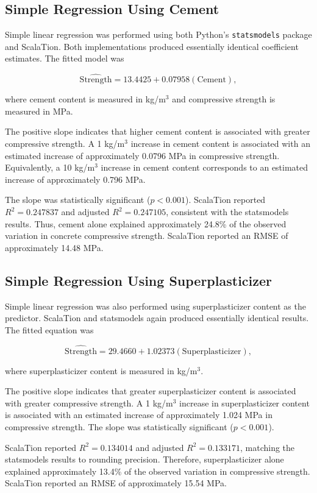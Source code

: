\subsection{Simple Regression Using Cement}

Simple linear regression was performed using both Python's
\texttt{statsmodels} package and ScalaTion. Both implementations produced
essentially identical coefficient estimates. The fitted model was

\[
\widehat{\mathrm{Strength}}
=
13.4425 + 0.07958(\mathrm{Cement}),
\]

where cement content is measured in kg/m$^3$ and compressive strength is
measured in MPa.

The positive slope indicates that higher cement content is associated with
greater compressive strength. A 1 kg/m$^3$ increase in cement content is
associated with an estimated increase of approximately 0.0796 MPa in
compressive strength. Equivalently, a 10 kg/m$^3$ increase in cement content
corresponds to an estimated increase of approximately 0.796 MPa.

The slope was statistically significant ($p<0.001$). ScalaTion reported
$R^2=0.247837$ and adjusted $R^2=0.247105$, consistent with the statsmodels
results. Thus, cement alone explained approximately 24.8\% of the observed
variation in concrete compressive strength. ScalaTion reported an RMSE of
approximately 14.48 MPa.

\subsection{Simple Regression Using Superplasticizer}

Simple linear regression was also performed using superplasticizer content as
the predictor. ScalaTion and statsmodels again produced essentially identical
results. The fitted equation was

\[
\widehat{\mathrm{Strength}}
=
29.4660 + 1.02373(\mathrm{Superplasticizer}),
\]

where superplasticizer content is measured in kg/m$^3$.

The positive slope indicates that greater superplasticizer content is
associated with greater compressive strength. A 1 kg/m$^3$ increase in
superplasticizer content is associated with an estimated increase of
approximately 1.024 MPa in compressive strength. The slope was statistically
significant ($p<0.001$).

ScalaTion reported $R^2=0.134014$ and adjusted $R^2=0.133171$, matching the
statsmodels results to rounding precision. Therefore, superplasticizer alone
explained approximately 13.4\% of the observed variation in compressive
strength. ScalaTion reported an RMSE of approximately 15.54 MPa.

